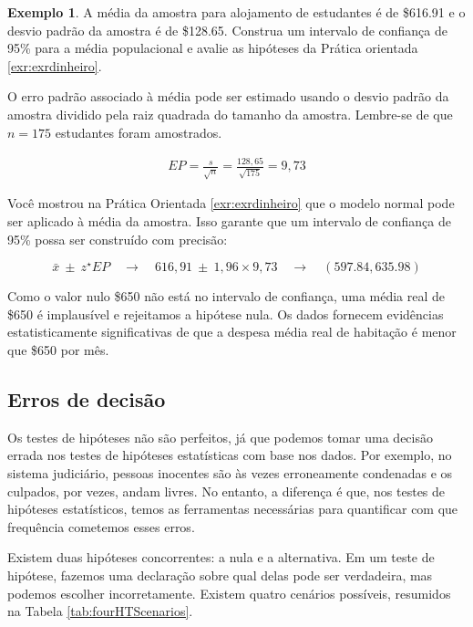 \documentclass[
]{book}
\theoremstyle{definition}
\theoremstyle{definition}
\newtheorem{example}{Exemplo}[chapter]
\theoremstyle{definition}
\theoremstyle{definition}
\theoremstyle{remark}
\begin{document}
\begin{example}
\protect\hypertarget{exm:unnamed-chunk-162}{}{\label{exm:unnamed-chunk-162} }A média da amostra para alojamento de estudantes é de \$616.91 e o desvio padrão da amostra é de \$128.65. Construa um intervalo de confiança de 95\% para a média populacional e avalie as hipóteses da Prática orientada \ref{exr:exrdinheiro}.
\end{example}

O erro padrão associado à média pode ser estimado usando o desvio padrão da amostra dividido pela raiz quadrada do tamanho da amostra. Lembre-se de que \(n = 175\) estudantes foram amostrados.

\begin{align*}
EP = \frac{s}{\sqrt{n}} = \frac{128,65}{\sqrt{175}} = 9,73
\end{align*}

Você mostrou na Prática Orientada \ref{exr:exrdinheiro} que o modelo normal pode ser aplicado à média da amostra. Isso garante que um intervalo de confiança de 95\% possa ser construído com precisão:

\[\bar{x}\ \pm\ z^{\star} EP \quad\to\quad 616,91\ \pm\ 1,96 \times 9,73 \quad \to \quad (597.84, 635.98) \]

Como o valor nulo \$650 não está no intervalo de confiança, uma média real de \$650 é implausível e rejeitamos a hipótese nula. Os dados fornecem evidências estatisticamente significativas de que a despesa média real de habitação é menor que \$650 por mês.

\hypertarget{decisionErrors}{%
\subsection{Erros de decisão}\label{decisionErrors}}

Os testes de hipóteses não são perfeitos, já que podemos tomar uma decisão errada nos testes de hipóteses estatísticas com base nos dados. Por exemplo, no sistema judiciário, pessoas inocentes são às vezes erroneamente condenadas e os culpados, por vezes, andam livres. No entanto, a diferença é que, nos testes de hipóteses estatísticos, temos as ferramentas necessárias para quantificar com que frequência cometemos esses erros.

Existem duas hipóteses concorrentes: a nula e a alternativa. Em um teste de hipótese, fazemos uma declaração sobre qual delas pode ser verdadeira, mas podemos escolher incorretamente. Existem quatro cenários possíveis, resumidos na Tabela \ref{tab:fourHTScenarios}.
\end{document}
